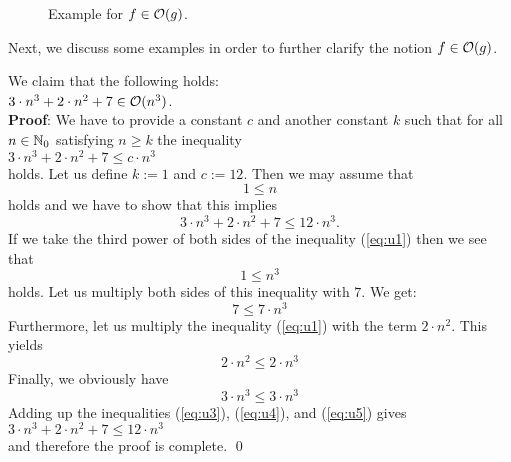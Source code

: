 \begin{figure}[!ht]
  \centering
  \caption{Example for $f \in \mathcal{O}(g)$.}
  \label{fig:big-o.eps}
\end{figure}


Next, we discuss some examples in order to further clarify the notion $f \in \mathcal{O}(g)$.


\example
We claim that the following holds:
\\[0.2cm]
\hspace*{1.3cm}
$3 \cdot n^3 + 2 \cdot n^2 + 7 \in \mathcal{O}(n^3)$. 
\\[0.2cm]
\textbf{Proof}:  We have to  provide a constant $c$ and another constant $k$ such that for all $n\in
{\mathbb N}_0$ satisfying
$n \geq k$ the inequality
\\[0.2cm]
\hspace*{1.3cm} 
$3 \cdot n^3 + 2 \cdot n^2 + 7 \leq c \cdot n^3$
\\[0.2cm]
holds.  Let us define  $k := 1$ and $c := 12$.  Then we may assume that 
\begin{equation}
  \label{eq:u1}
  1\leq n  
\end{equation}
holds and we have to show that this implies 
\begin{equation}
  \label{eq:u2}
  3 \cdot n^3 + 2 \cdot n^2 + 7 \leq 12 \cdot n^3.
\end{equation}
If we take the third power of both sides of the inequality (\ref{eq:u1}) then we see that
\begin{equation}
  \label{eq:u3pre}
  1 \leq n^3  
\end{equation}
holds.  Let us multiply both sides of this inequality with $7$.  We get: 
\begin{equation}
  \label{eq:u3}
  7 \leq 7 \cdot n^3
\end{equation}
Furthermore, let us multiply the inequality (\ref{eq:u1}) with the term $2\cdot n^2$.  This yields
\begin{equation}
  \label{eq:u4}
  2 \cdot n^2 \leq 2 \cdot n^3  
\end{equation}
Finally, we obviously have
\begin{equation}
  \label{eq:u5}
  3 \cdot n^3 \leq 3 \cdot n^3
\end{equation}
Adding up the inequalities (\ref{eq:u3}), (\ref{eq:u4}), and (\ref{eq:u5}) gives \\[0.2cm]
\hspace*{1.3cm} $3 \cdot n^3 + 2 \cdot n^2 + 7 \leq 12 \cdot n^3$ \\[0.2cm]
and therefore the proof is complete. \qed

